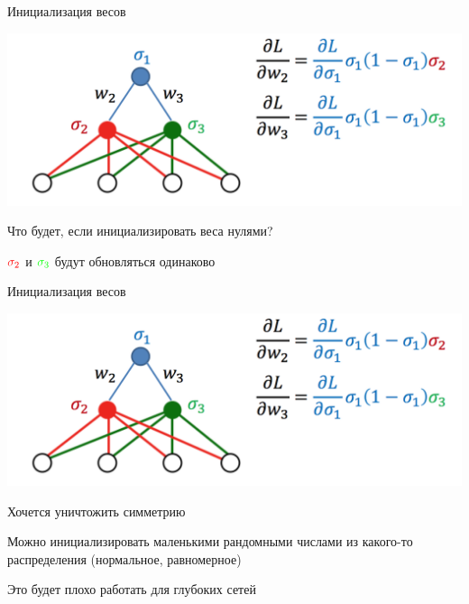 \documentclass[notes,12pt, aspectratio=169]{beamer}
\newenvironment{wideitemize}{\itemize\addtolength{\itemsep}{10pt}}{\enditemize}
\begin{document}
\begin{frame}{Инициализация весов}
	\begin{center}
		\includegraphics[width=.6\linewidth]{init1.png}
	\end{center}
	\begin{wideitemize}
		\item  Что будет, если инициализировать веса нулями?  \pause 
		\item  ${\color{red} \sigma_2 }$ и ${\color{green} \sigma_3 }$  будут обновляться одинаково
	\end{wideitemize}
\end{frame}


\begin{frame}{Инициализация весов}
	\begin{center}
		\includegraphics[width=.6\linewidth]{init1.png}
	\end{center}
	\begin{wideitemize}
		\item  Хочется уничтожить симметрию
		\item  Можно инициализировать маленькими рандомными числами из какого-то распределения (нормальное, равномерное)
		\item {\color{red}  Это будет плохо работать для глубоких сетей} 
	\end{wideitemize}
\end{frame}
\end{document}
